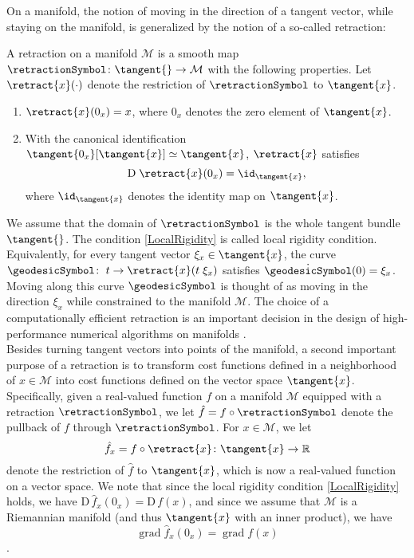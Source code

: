 On a manifold, the notion of moving in the direction of a tangent vector, while staying on the manifold, is generalized by the notion of a so-called retraction:
\begin{definition}\label{Retraction}
    A retraction on a manifold $\mathcal{M}$ is a smooth map $\retractionSymbol \colon \tangent{} \to \mathcal{M}$ with the following properties. Let $\retract{x}(\cdot)$ denote the restriction of $\retractionSymbol$ to $\tangent{x}$. 
    \begin{enumerate}
        \item $\retract{x}(0_x) = x$, where $0_x$ denotes the zero element of $\tangent{x}$. 
        \item With the canonical identification $\tangent{0_x}[\tangent{x}] \simeq \tangent{x}$, $\retract{x}$ satisfies \begin{equation} \mathrm{D} \; \retract{x}(0_x) = \id_{\tangent{x}}, \label{LocalRigidity} \end{equation} where $\id_{\tangent{x}}$ denotes the identity map on $\tangent{x}$.  
    \end{enumerate}
\end{definition}
We assume that the domain of $\retractionSymbol$ is the whole tangent bundle $\tangent{}$. The condition \cref{LocalRigidity} is called local rigidity condition. Equivalently, for every tangent vector $\xi_x \in \tangent{x}$, the curve $\geodesicSymbol \colon \; t \to \retract{x}(t \; \xi_x)$ satisfies $\dot{\geodesicSymbol}(0) = \xi_x$. Moving along this curve $\geodesicSymbol$ is thought of as moving in the direction $\xi_x$ while constrained to the manifold $\mathcal{M}$. The choice of a computationally efficient retraction is an important decision in the design of high-performance numerical algorithms on manifolds \cite[p.~54]{AbsilMahonySepulchre:2008}. \\
Besides turning tangent vectors into points of the manifold, a second important purpose of a retraction is to transform cost functions defined in a neighborhood of $x \in \mathcal{M}$ into cost functions defined on the vector space $\tangent{x}$. Specifically, given a real-valued function $f$ on a manifold $\mathcal{M}$ equipped with a retraction $\retractionSymbol$, we let $\hat{f} = f \circ \retractionSymbol$ denote the pullback of $f$ through $\retractionSymbol$. For $x \in \mathcal{M}$, we let
\begin{equation}\label{pullback}
    \hat{f}_x = f \circ \retract{x} \colon \tangent{x} \to \mathbb{R}
\end{equation}
denote the restriction of $\hat{f}$ to $\tangent{x}$, which is now a real-valued function on a vector space. We note that since the local rigidity condition \cref{LocalRigidity} holds, we have $\mathrm{D} \, \hat{f}_x (0_x) = \mathrm{D} \, f(x)$, and since we assume that $\mathcal{M}$ is a Riemannian manifold (and thus $\tangent{x}$ with an inner product), we have 
\begin{equation}\label{PullbackGradient}
    \operatorname{grad} \hat{f}_x (0_x) = \operatorname{grad} f(x)
\end{equation}
\cite[p.~54-56]{AbsilMahonySepulchre:2008}.
